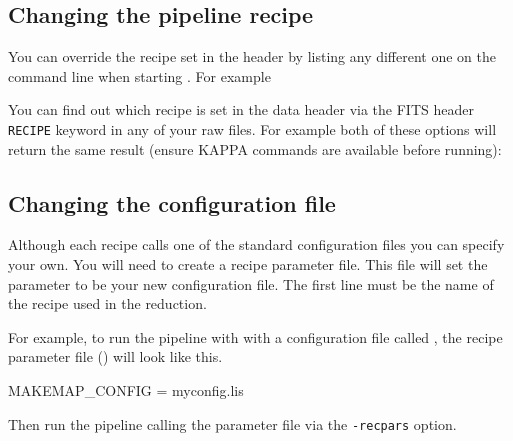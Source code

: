 \begin{terminalv}
\end{terminalv}



\subsection{Changing the pipeline recipe}
\label{subsec:ChangeRecipe}

You can override the recipe set in the header by listing any different
one on the command line when starting \oracdr. For example
\begin{terminalv}
\end{terminalv}

You can find out which recipe is set in the data header via the FITS
header \texttt{RECIPE} keyword in any of your raw files.  For
example both of these options will return the same result (ensure KAPPA
commands are available before running):
\begin{terminalv}
\end{terminalv}

\subsection{Changing the configuration file}

Although each recipe calls one of the standard configuration files
you can specify your own. You will need to create a recipe parameter
file. This file will set the parameter  to be
your new configuration file. The first line must be the name of the
recipe used in the reduction.

For example, to run the pipeline with  with a
configuration file called , the recipe parameter file
() will look like this.
\vspace{0.2cm}
\begin{terminalv}
MAKEMAP_CONFIG = myconfig.lis
\end{terminalv}

Then run the pipeline calling the parameter file via the
\texttt{-recpars} option.
\begin{terminalv}
\end{terminalv}

